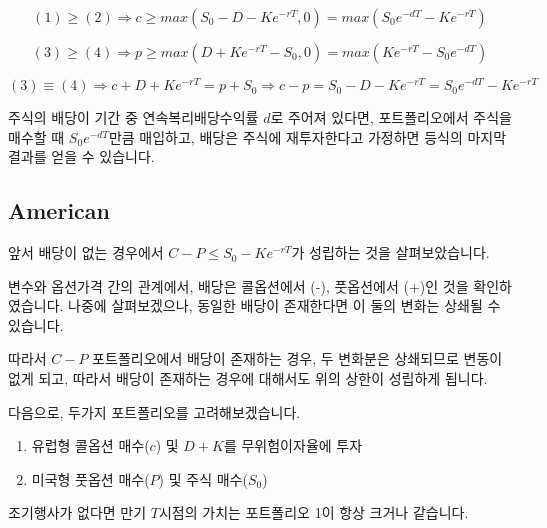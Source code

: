 \documentclass[
  letterpaper,
  DIV=11,
  numbers=noendperiod]{scrreprt}
\providecommand{\tightlist}{%
  \setlength{\itemsep}{0pt}\setlength{\parskip}{0pt}}\usepackage{longtable,booktabs,array}
\begin{document}
\[(1)\geq (2)\Rightarrow c\geq max(S_0-D-Ke^{-rT},0)=max(S_0e^{-dT}-Ke^{-rT})\]

\[(3)\geq (4)\Rightarrow p\geq max(D+Ke^{-rT}-S_0,0)=max(Ke^{-rT}-S_0e^{-dT})\]

\[(3)\equiv(4)\Rightarrow c+D+Ke^{-rT}=p+S_0\Rightarrow c-p=S_0-D-Ke^{-rT}=S_0e^{-dT}-Ke^{-rT}\]

\begin{tcolorbox}[enhanced jigsaw, titlerule=0mm, bottomtitle=1mm, left=2mm, title=\textcolor{quarto-callout-tip-color}{\faLightbulb}\hspace{0.5em}{Tip}, toptitle=1mm, bottomrule=.15mm, colframe=quarto-callout-tip-color-frame, breakable, opacityback=0, rightrule=.15mm, opacitybacktitle=0.6, coltitle=black, colback=white, arc=.35mm, colbacktitle=quarto-callout-tip-color!10!white, toprule=.15mm, leftrule=.75mm]

주식의 배당이 기간 중 연속복리배당수익률 \(d\)로 주어져 있다면,
포트폴리오에서 주식을 매수할 때 \(S_0e^{-dT}\)만큼 매입하고, 배당은
주식에 재투자한다고 가정하면 등식의 마지막 결과를 얻을 수 있습니다.

\end{tcolorbox}

\subsection*{American}\label{american-1}

앞서 배당이 없는 경우에서 \(C-P\leq S_0-Ke^{-rT}\)가 성립하는 것을
살펴보았습니다.

변수와 옵션가격 간의 관계에서, 배당은 콜옵션에서 (-), 풋옵션에서 (+)인
것을 확인하였습니다. 나중에 살펴보겠으나, 동일한 배당이 존재한다면 이
둘의 변화는 상쇄될 수 있습니다.

따라서 \(C-P\) 포트폴리오에서 배당이 존재하는 경우, 두 변화분은
상쇄되므로 변동이 없게 되고, 따라서 배당이 존재하는 경우에 대해서도 위의
상한이 성립하게 됩니다.

다음으로, 두가지 포트폴리오를 고려해보겠습니다.

\begin{enumerate}
\def\labelenumi{\arabic{enumi}.}
\tightlist
\item
  유럽형 콜옵션 매수(\(c\)) 및 \(D+K\)를 무위험이자율에 투자
\item
  미국형 풋옵션 매수(\(P\)) 및 주식 매수(\(S_0\))
\end{enumerate}

조기행사가 없다면 만기 \(T\)시점의 가치는 포트폴리오 1이 항상 크거나
같습니다.
\end{document}
